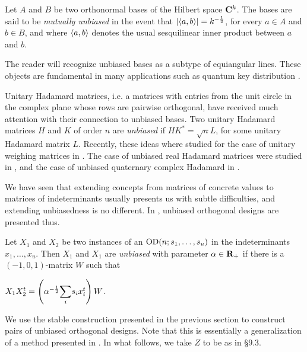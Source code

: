 \documentclass[../../../main]{subfiles}
\begin{document}
Let $A$ and $B$ be two orthonormal bases of the Hilbert space $\mathbf{C}^k$. The bases are said to be {\it mutually unbiased} in the event that $|\langle a,b\rangle|=k^{-\frac{1}{2}}$, for every $a \in A$ and $b \in B$, and where $\langle a,b\rangle$ denotes the usual sesquilinear inner product between $a$ and $b$.

The reader will recognize unbiased bases as a subtype of equiangular lines. These objects are fundamental in many applications such as quantum key distribution \cite[see][]{real-unbiased-bases}.

Unitary Hadamard matrices, i.e. a matrices with entries from the unit circle in
the complex plane whose rows are pairwise orthogonal, have received much
attention with their connection to unbiased bases. Two unitary Hadamard matrices
$H$ and $K$ of order $n$ are {\it unbiased} if
$HK^*=\sqrt{n}L$, for some unitary Hadamard matrix $L$. Recently, these ideas
where studied for the case of unitary weighing matrices  in \cite{unbiased-weighing}. The case of unbiased real Hadamard matrices were studied in \cite{unbiased-real}, and the case of unbiased quaternary complex Hadamard in \cite{unbiased-complex}.

We have seen that extending concepts from matrices of concrete values to matrices of indeterminants usually presents us with subtle difficulties, and extending unbiasedness is no different. In \cite{unbiased-od}, unbiased orthogonal designs are presented thus.

\begin{defin}
 Let $X_1$ and $X_2$ be two instances of an $\text{OD}(n;s_1,\dots,s_u)$ in the indeterminants $x_1,\dots,x_u$. Then $X_1$ and $X_1$ are {\it unbiased} with parameter $\alpha \in \mathbf{R}_+$ if there is a $(-1,0,1)$-matrix $W$ such that
 \begin{defenum}
  \item $X_1X_2^t = \left(\alpha^{-\frac{1}{2}}\ssum_i s_ix_i^t\right)W$.
 \end{defenum}
\end{defin}

We use the stable construction presented in the previous section to construct pairs of unbiased orthogonal designs. Note that this is essentially a generalization of a method presented in \cite{splittable-hadamard}. In what follows, we take $Z$ to be as in \S9.3.
\end{document}
